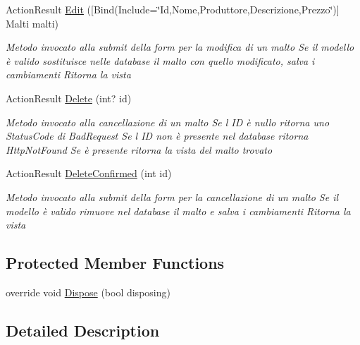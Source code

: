 \begin{DoxyCompactItemize}
Action\+Result \mbox{\hyperlink{class_brew_day2_1_1_controllers_1_1_maltis_controller_a916ce2dd1063485b443a3bc51f8101f7}{Edit}} (\mbox{[}Bind(Include=\char`\"{}Id,Nome,Produttore,Descrizione,Prezzo\char`\"{})\mbox{]} Malti malti)
\begin{DoxyCompactList}\small\item\em Metodo invocato alla submit della form per la modifica di un malto Se il modello è valido sostituisce nelle database il malto con quello modificato, salva i cambiamenti Ritorna la vista \end{DoxyCompactList}\item 
Action\+Result \mbox{\hyperlink{class_brew_day2_1_1_controllers_1_1_maltis_controller_aca90310d889bcd8615707d2fdb81d7e5}{Delete}} (int? id)
\begin{DoxyCompactList}\small\item\em Metodo invocato alla cancellazione di un malto Se l\textquotesingle{} ID è nullo ritorna uno Status\+Code di Bad\+Request Se l\textquotesingle{} ID non è presente nel database ritorna Http\+Not\+Found Se è presente ritorna la vista del malto trovato \end{DoxyCompactList}\item 
Action\+Result \mbox{\hyperlink{class_brew_day2_1_1_controllers_1_1_maltis_controller_aef6ed05fcb512703ac93e52be1b89f4c}{Delete\+Confirmed}} (int id)
\begin{DoxyCompactList}\small\item\em Metodo invocato alla submit della form per la cancellazione di un malto Se il modello è valido rimuove nel database il malto e salva i cambiamenti Ritorna la vista \end{DoxyCompactList}\end{DoxyCompactItemize}
\subsection*{Protected Member Functions}
\begin{DoxyCompactItemize}
\item 
override void \mbox{\hyperlink{class_brew_day2_1_1_controllers_1_1_maltis_controller_a3a721faa697fca3cbac0282df0a23843}{Dispose}} (bool disposing)
\end{DoxyCompactItemize}


\subsection{Detailed Description}



